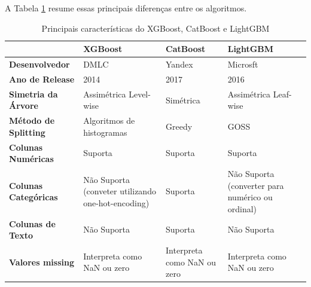 A Tabela \ref{tabela:ex:dif:algo} resume essas principais diferenças entre os algoritmos.
\begin{table}[H]
\centering
\caption{Principais características do XGBoost, CatBoost e LightGBM}
\label{tabela:ex:dif:algo}
\begin{tabular}{|p{4cm}|p{3cm}|p{3cm}|p{3cm}|} 
 \hline
& \textbf{XGBoost} & \textbf{CatBoost} & \textbf{LightGBM} \\
  \hline
  \textbf{Desenvolvedor} & DMLC & Yandex & Microsft \\
  \hline
  \textbf{Ano de Release} & 2014 & 2017 & 2016 \\
  \hline
  \textbf{Simetria da Árvore} & Assimétrica Level-wise  & Simétrica & Assimétrica Leaf-wise \\
  \hline
  \textbf{Método de Splitting} & Algoritmos de histogramas & Greedy & GOSS \\
  \hline
  \textbf{Colunas Numéricas} & Suporta & Suporta & Suporta \\
  \hline
  \textbf{Colunas Categóricas} & Não Suporta (conveter utilizando one-hot-encoding) & Suporta & Não Suporta (converter para numérico ou ordinal) \\
  \hline
  \textbf{Colunas de Texto} & Não Suporta & Suporta & Não Suporta \\
  \hline
  \textbf{Valores missing} & Interpreta como NaN ou zero & Interpreta como NaN ou zero & Interpreta como NaN ou zero \\
  \hline
\end{tabular}
\end{table}

